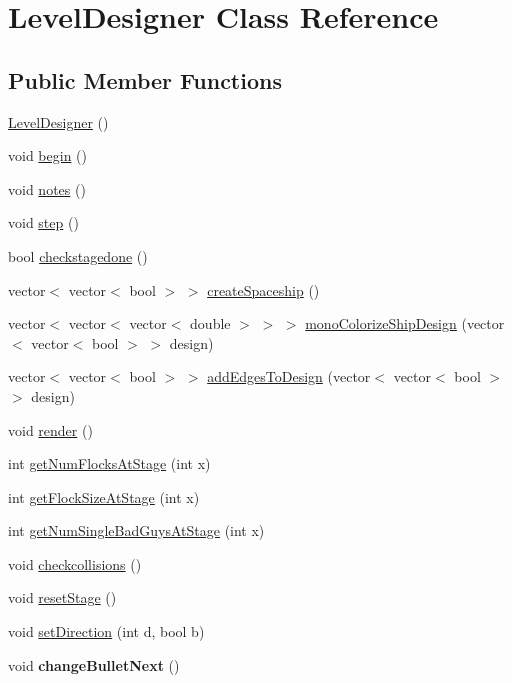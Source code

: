 \hypertarget{classLevelDesigner}{\section{Level\-Designer Class Reference}
\label{classLevelDesigner}
}
\subsection*{Public Member Functions}
\begin{DoxyCompactItemize}
\item 
\hyperlink{classLevelDesigner_a2c63e9c0ec2aff52679f2502caab3728}{Level\-Designer} ()
\item 
void \hyperlink{classLevelDesigner_a3e2f50dd1a1167e61c628de8b59536aa}{begin} ()
\item 
void \hyperlink{classLevelDesigner_ab81f23edbd7b3888214a834e0c20d4f3}{notes} ()
\item 
void \hyperlink{classLevelDesigner_ad53fb2b0b229efa45870f8ea62ac951b}{step} ()
\item 
bool \hyperlink{classLevelDesigner_ae2312a83100ff76d3b45f98d54bfd15f}{checkstagedone} ()
\item 
vector$<$ vector$<$ bool $>$ $>$ \hyperlink{classLevelDesigner_a434121891e8c031695f4080ba97ad24e}{create\-Spaceship} ()
\item 
vector$<$ vector$<$ vector$<$ double $>$ $>$ $>$ \hyperlink{classLevelDesigner_a381a31ddb06426d832fcf869f9d2cfca}{mono\-Colorize\-Ship\-Design} (vector$<$ vector$<$ bool $>$ $>$ design)
\item 
vector$<$ vector$<$ bool $>$ $>$ \hyperlink{classLevelDesigner_a843f2ccb66abc46b8d8db9d6e765f80f}{add\-Edges\-To\-Design} (vector$<$ vector$<$ bool $>$ $>$ design)
\item 
void \hyperlink{classLevelDesigner_a0b81f29de4e4849d18bb8f4da03b9d38}{render} ()
\item 
int \hyperlink{classLevelDesigner_af6e9cd4849fe0649868b8afddb42c8be}{get\-Num\-Flocks\-At\-Stage} (int x)
\item 
int \hyperlink{classLevelDesigner_a6fab77d200b2da4923cfdf21c06bc1c0}{get\-Flock\-Size\-At\-Stage} (int x)
\item 
int \hyperlink{classLevelDesigner_abd07c21b20f6282ce4c6cc2efa52c576}{get\-Num\-Single\-Bad\-Guys\-At\-Stage} (int x)
\item 
void \hyperlink{classLevelDesigner_a5a5ed54042160d1d6f105758914642b0}{checkcollisions} ()
\item 
void \hyperlink{classLevelDesigner_a0f6273aa8428331c297cf8c5503d8512}{reset\-Stage} ()
\item 
void \hyperlink{classLevelDesigner_a98ae7848ed3e4571c767ee81a2612bf7}{set\-Direction} (int d, bool b)
\item 
\hypertarget{classLevelDesigner_a2f2d6c3c005099dbd7238b8541fbdd33}{void {\bfseries change\-Bullet\-Next} ()}\label{classLevelDesigner_a2f2d6c3c005099dbd7238b8541fbdd33}


\end{DoxyCompactItemize}
